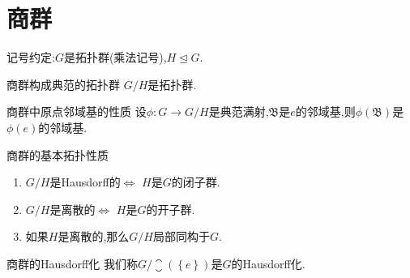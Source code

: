 \section{商群}

记号约定:$G$是拓扑群(乘法记号),$H\unlhd G$.

\begin{proposition}{商群构成典范的拓扑群}{}
	$G/H$是拓扑群.
\end{proposition}

\begin{proposition}{商群中原点邻域基的性质}{}
	设$\phi:G\to G/H$是典范满射,$\mathfrak{B}$是$e$的邻域基,则$\phi\left(\mathfrak{B}\right)$是$\phi\left(e\right)$的邻域基.
\end{proposition}

\begin{proposition}{商群的基本拓扑性质}{}
	\begin{enumerate}
		\item $G/H$是Hausdorff的$\iff$ $H$是$G$的闭子群.
		\item $G/H$是离散的$\iff$ $H$是$G$的开子群.
		\item 如果$H$是离散的,那么$G/H$局部同构于$G$.
	\end{enumerate}
\end{proposition}

\begin{definition}{商群的Hausdorff化}{}
	我们称$G/\closure\left(\left\{e\right\}\right)$是$G$的Hausdorff化.
\end{definition}

